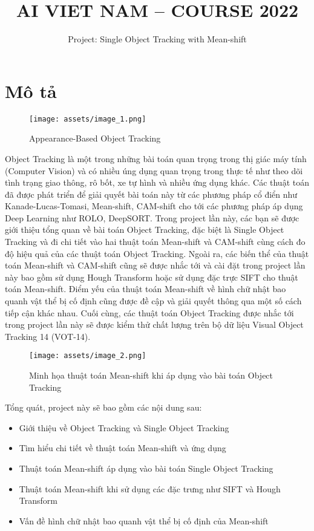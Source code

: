 \documentclass[11pt]{article}
\title{\LARGE AI VIET NAM – COURSE 2022}
\author{\Huge Project: Single Object Tracking with Mean-shift}
\begin{document}
\maketitle

\section*{Mô tả}

\begin{figure}[H]
    \texttt{[image: assets/image\_1.png]}
    \centering
    \caption{Appearance-Based Object Tracking}
\end{figure}

Object Tracking là một trong những bài toán quan trọng trong thị giác máy tính (Computer Vision) và có nhiều úng dụng quan trọng trong thực tế như theo dõi tình trạng giao thông, rô bốt, xe tự hình và nhiều ứng dụng khác. Các thuật toán đã được phát triển để giải quyết bài toán này từ các phương pháp cổ điển như Kanade-Lucas-Tomasi, Mean-shift, CAM-shift cho tới các phương pháp áp dụng Deep Learning như ROLO, DeepSORT. Trong project lần này, các bạn sẽ được giới thiệu tổng quan về bài toán Object Tracking, đặc biệt là Single Object Tracking và đi chi tiết vào hai thuật toán Mean-shift và CAM-shift cùng cách đo độ hiệu quả của các thuật toán Object Tracking. Ngoài ra, các biến thể của thuật toán Mean-shift và CAM-shift cũng sẽ được nhắc tới và cài đặt trong project lần này bao gồm sử dụng Hough Transform hoặc sử dụng đặc trực SIFT cho thuật toán Mean-shift. Điểm yếu của thuật toán Mean-shift về hình chữ nhật bao quanh vật thể bị cố định cũng được đề cập và giải quyết thông qua một số cách tiếp cận khác nhau. Cuối cùng, các thuật toán Object Tracking được nhắc tới trong project lần này sẽ được kiểm thử chất lượng trên bộ dữ liệu Visual Object Tracking 14 (VOT-14).

\begin{figure}[H]
    \texttt{[image: assets/image\_2.png]}
    \centering
    \caption{Minh họa thuật toán Mean-shift khi áp dụng vào bài toán Object Tracking}
\end{figure}

Tổng quát, project này sẽ bao gồm các nội dung sau:
\begin{itemize}
    \item Giới thiệu về Object Tracking và Single Object Tracking
    \item Tìm hiểu chi tiết về thuật toán Mean-shift và ứng dụng
    \item Thuật toán Mean-shift áp dụng vào bài toán Single Object Tracking
    \item Thuật toán Mean-shift khi sử dụng các đặc trưng như SIFT và Hough Transform
    \item Vấn đề hình chữ nhật bao quanh vật thể bị cố định của Mean-shift
\end{itemize}
\end{document}
